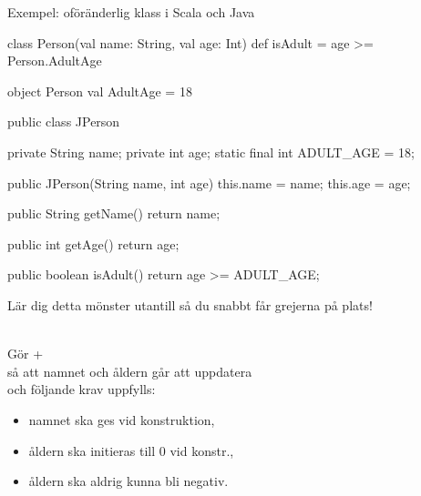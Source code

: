 \begin{Slide}{Exempel: oföränderlig klass i Scala och Java}\SlideFontTiny
\vspace{-1em}
\begin{multicols}{2}
\begin{CodeSmall}[basicstyle=\ttfamily\SlideFontSize{5.7}{6.7}]
class Person(val name: String, val age: Int){
  def isAdult = age >= Person.AdultAge
}

object Person {
  val AdultAge = 18
}
\end{CodeSmall}

\columnbreak

\pause
\begin{CodeSmall}[language=Java,basicstyle=\ttfamily\SlideFontSize{5.7}{6.7}]
public class JPerson {
    private String name;
    private int age;
    static final int ADULT_AGE = 18;
      
    public JPerson(String name, int age){
      this.name = name;
      this.age = age;
    }

    public String getName(){
        return name;
    }

    public int getAge(){
        return age;
    }
    
    public boolean isAdult(){
        return age >= ADULT_AGE;
    }
}
\end{CodeSmall}
Lär dig detta mönster utantill så du snabbt får grejerna på plats!
\end{multicols}
\pause\vspace{-11em} 
\\Gör  +  \\så att namnet och åldern går att uppdatera\\och följande krav uppfylls:
\begin{itemize}
\item namnet ska ges vid konstruktion,
\item åldern ska initieras till 0 vid konstr.,
\item åldern ska aldrig kunna bli negativ.
\end{itemize}
\end{Slide}


